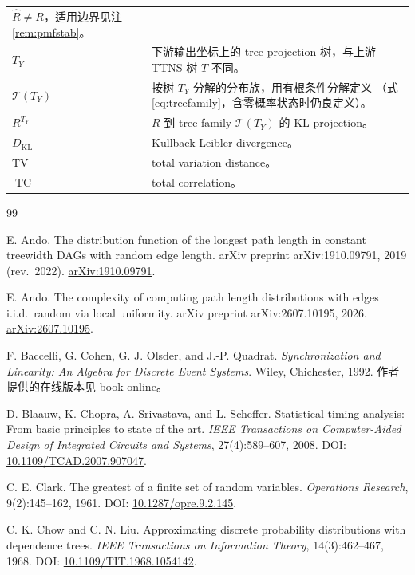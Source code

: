 \documentclass[a4paper,11pt]{article}
\theoremstyle{definition}
\newcommand{\1}{\mathbf 1}
\newcommand{\TV}{\mathrm{TV}}
\newcommand{\KL}{\mathrm{KL}}
\newcommand{\TC}{\operatorname{TC}}
\newcommand{\calT}{\mathcal T}
\begin{document}
\begin{longtable}{>{\raggedright\arraybackslash}p{}
                  >{\raggedright\arraybackslash}p{}}
$\widehat R\ne R$，适用边界见注 \ref{rem:pmfstab}。\\
$T_Y$ & 下游输出坐标上的 tree projection 树，与上游 TTNS 树 $T$ 不同。\\
$\calT(T_Y)$ & 按树 $T_Y$ 分解的分布族，用有根条件分解定义
（式 \eqref{eq:treefamily}，含零概率状态时仍良定义）。\\
$R^{T_Y}$ & $R$ 到 tree family $\calT(T_Y)$ 的 KL projection。\\
$D_{\KL}$ & Kullback-Leibler divergence。\\
$\TV$ & total variation distance。\\
$\TC$ & total correlation。\\
\bottomrule
\end{longtable}

\begin{thebibliography}{99}
\sloppy

E. Ando.
\newblock The distribution function of the longest path length in constant
treewidth DAGs with random edge length.
\newblock arXiv preprint arXiv:1910.09791, 2019 (rev.\ 2022).
\newblock \href{https://arxiv.org/abs/1910.09791}{arXiv:1910.09791}.

E. Ando.
\newblock The complexity of computing path length distributions with edges
i.i.d.\ random via local uniformity.
\newblock arXiv preprint arXiv:2607.10195, 2026.
\newblock \href{https://arxiv.org/abs/2607.10195}{arXiv:2607.10195}.

F. Baccelli, G. Cohen, G. J. Olsder, and J.-P. Quadrat.
\newblock \emph{Synchronization and Linearity: An Algebra for Discrete Event
Systems}.
\newblock Wiley, Chichester, 1992.
\newblock 作者提供的在线版本见
\href{https://www.rocq.inria.fr/metalau/cohen/SED/book-online.html}
{book-online}。

D. Blaauw, K. Chopra, A. Srivastava, and L. Scheffer.
\newblock Statistical timing analysis: From basic principles to state of
the art.
\newblock \emph{IEEE Transactions on Computer-Aided Design of Integrated
Circuits and Systems}, 27(4):589--607, 2008.
\newblock DOI: \href{https://doi.org/10.1109/TCAD.2007.907047}
{10.1109/TCAD.2007.907047}.

C. E. Clark.
\newblock The greatest of a finite set of random variables.
\newblock \emph{Operations Research}, 9(2):145--162, 1961.
\newblock DOI: \href{https://doi.org/10.1287/opre.9.2.145}
{10.1287/opre.9.2.145}.

C. K. Chow and C. N. Liu.
\newblock Approximating discrete probability distributions with dependence trees.
\newblock \emph{IEEE Transactions on Information Theory}, 14(3):462--467, 1968.
\newblock DOI: \href{https://doi.org/10.1109/TIT.1968.1054142}
{10.1109/TIT.1968.1054142}.


\end{thebibliography}
\end{document}
